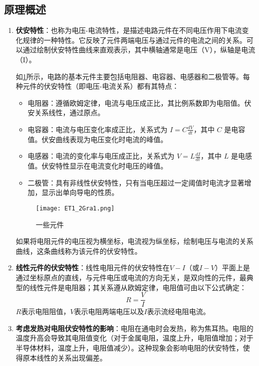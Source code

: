 \documentclass[dvipsnames, svgnames,a4paper,11pt]{article}
\begin{document}
	\subsection{原理概述}
	\begin{enumerate}
		\item \textbf{伏安特性}：也称为电压-电流特性，是描述电路元件在不同电压作用下电流变化规律的一种特性。它反映了元件两端电压与通过元件的电流之间的关系。可以通过绘制伏安特性曲线来直观表示，其中横轴通常是电压（V），纵轴是电流（I）。
		
		如\cref{fig:fig1}所示，电路的基本元件主要包括电阻器、电容器、电感器和二极管等。每种元件的伏安特性（即电压-电流关系）都有其特点：
		
		\begin{itemize}
			\item 电阻器：遵循欧姆定律，电流与电压成正比，其比例系数即为电阻值。伏安关系线性，通过原点。
			\item 电容器：电流与电压变化率成正比，关系式为 \(I = C \frac{dV}{dt}\)，其中 \(C\) 是电容值。伏安曲线表现为电压变化时电流的峰值。
			\item 电感器：电流的变化率与电压成正比，关系式为 \(V = L \frac{dI}{dt}\)，其中 \(L\) 是电感值。伏安特性显示在电流变化时电压的峰值。
			\item 二极管：具有非线性伏安特性，只有当电压超过一定阈值时电流才显著增加，显示出单向导电的性质。
		\end{itemize}
		
		
		\begin{figure}[htbp]
			\centering
			\texttt{[image: ET1\_2Gra1.png]}
			\caption{一些元件}
			\label{fig:fig1}
		\end{figure}
		
		如果将电阻元件的电压视为横坐标，电流视为纵坐标，绘制电压与电流的关系曲线，这条曲线称为该元件的伏安特性。
		
		\item \textbf{线性元件的伏安特性}：线性电阻元件的伏安特性在\(V-I\)（或\(I-V\)）平面上是通过坐标原点的直线，与元件电压或电流的方向无关，是双向性的元件，最典型的线性元件是电阻器；其关系遵从欧姆定律，电阻值可由以下公式确定：\[R = \frac{V}{I}\]
		$R$表示电阻阻值，$V$表示电阻两端电压以及$I$表示流经电阻电流。
		
		\item \textbf{考虑发热对电阻伏安特性的影响}：电阻在通电时会发热，称为焦耳热。电阻的温度升高会导致其电阻值变化（对于金属电阻，温度上升，电阻值增加；对于半导体材料，温度上升，电阻值减少）。这种现象会影响电阻的伏安特性，使得原本线性的关系出现偏差。
		

\end{enumerate}
\end{document}
